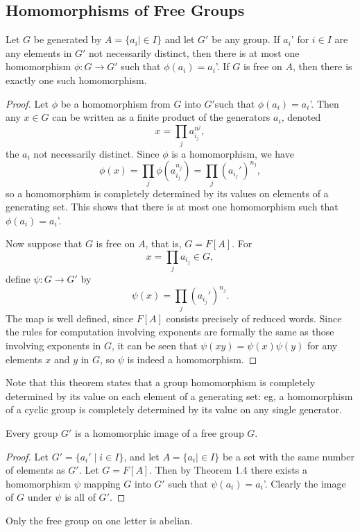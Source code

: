 \subsection{Homomorphisms of Free Groups}
\begin{theorem}
    Let $G$ be generated by $A=\{a_i \mid \in I\} $ and let $G'$ be any group. If $a_i$' for $i\in I$ are any elements in $G'$ not necessarily distinct, then there is at most one homomorphism $\phi \colon G \to G'$ such that $\phi(a_i)=a_i$'. If $G$ is free on $A$, then there is exactly one such homomorphism.
\end{theorem}
\begin{proof}
    Let $\phi$ be a homomorphism from $G$ into $G'$such that $\phi(a_i)=a_i$'. Then any $x\in G$ can be written as a finite product of the generators $a_i$, denoted \[
        x= \prod_{j} a_{i_{j}}^{n^j},
    \] the $a_i$ not necessarily distinct. Since $\phi$ is a homomorphism, we have \[
    \phi(x)=\prod_{j}\phi\left( a_{i_j}^{n_j} \right) =\prod_{j}\left( a_{i_j}' \right)^{n_j},
\] so a homomorphism is completely determined by its values on elements of a generating set. This shows that there is at most one homomorphism such that  $\phi(a_i)=a_i$'.

Now suppose that $G$ is free on $A$, that is, $G=F[A]$. For \[
x=\prod_{j} a_{i_j} \in G,
\] define $\psi \colon G \to G'$ by \[
\psi(x)=\prod_{j}\left( a_{i_j}'\right) ^{n_j}.
\] The map is well defined, since $F[A]$ consists precisely of reduced words. Since the rules for computation involving exponents are formally the same as those involving exponents in $G$, it can be seen that $\psi(xy)=\psi(x)\psi(y)$ for any elements $x$ and $y$ in $G$, so $\psi$ is indeed a homomorphism.
\end{proof}
Note that this theorem states that a group homomorphism is completely determined by its value on each element of a generating set: eg, a homomorphism of a cyclic group is completely determined by its value on any single generator.
\begin{cor}
    Every group $G'$ is a homomorphic image of a free group $G$.
\end{cor}
\begin{proof}
    Let $G'=\{a_i' \mid i\in I\} $, and let $A=\{a_i \mid \in I\} $ be a set with the same number of elements as $G'$. Let $G=F[A]$. Then by Theorem 1.4 there exists a homomorphism $\psi$ mapping $G$ into $G'$ such that $\psi(a_i)=a_i$'. Clearly the image of $G$ under $\psi$ is all of $G'$.
\end{proof}
Only the free group on one letter is abelian.
